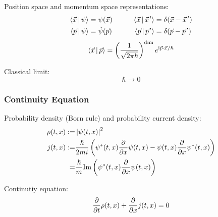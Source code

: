 		\noindent
		Position space and momentum space representations:
		\begin{equation}
			\begin{aligned}
				\Braket{\vec{x} | \psi} &= \psi(\vec{x}) &\hspace{20pt}
				\Braket{\vec{x} | \pvec{x}'} &= \delta(\vec{x} - \pvec{x}') \\
				\Braket{\vec{p} | \psi} &= \tilde{\psi}(\vec{p}) &\hspace{20pt}
				\Braket{\vec{p} | \pvec{p}'} &= \delta(\vec{p} - \pvec{p}') \\
			\end{aligned}
		\end{equation}
		\begin{equation}
			\begin{aligned}
				\Braket{\vec{x} | \vec{p}} &= \left( \frac{1}{\sqrt{2\pi\hbar}} \right)^\mathrm{dim} e^{\mathrm{i} \vec{p}\cdot\vec{x} / \hbar} \\
			\end{aligned}
		\end{equation}

		\noindent
		Classical limit:%
		\begin{equation}
			\hbar \rightarrow 0
		\end{equation}

		\subsubsection{Continuity Equation}
			\noindent
			Probability density (Born rule) and probability current density:
			\begin{equation}
				\begin{aligned}
					\rho(t,x) :=& \left|\psi(t,x)\right|^2 \\
					j(t,x) :=& \frac{\hbar}{2mi}\left(
						\psi^*(t,x)\frac{\partial }{\partial x}\psi(t,x) - \psi(t,x)\frac{\partial }{\partial x}\psi^*(t,x)
					\right) \\
					=& \frac{\hbar}{m} \mathrm{Im}\left(
						\psi^*(t,x) \frac{\partial }{\partial x}\psi(t,x)
					\right)\\
				\end{aligned}
			\end{equation}

			\noindent
			Continutiy equation:
			\begin{equation}
				\frac{\partial }{\partial t}\rho(t,x) + \frac{\partial }{\partial x}j(t,x) = 0
			\end{equation}

